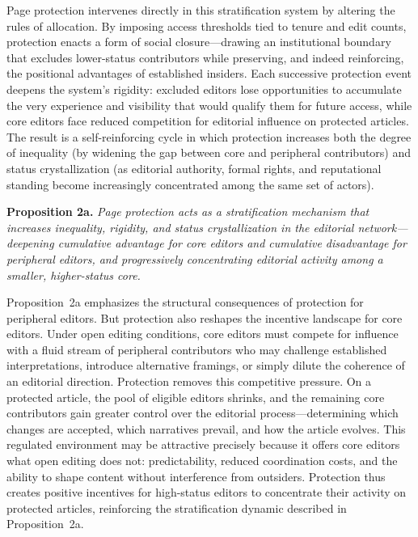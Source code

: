 \documentclass[11pt]{article}
\begin{document}
Page protection intervenes directly in this stratification system by altering the rules of allocation. By imposing access thresholds tied to tenure and edit counts, protection enacts a form of social closure---drawing an institutional boundary that excludes lower-status contributors while preserving, and indeed reinforcing, the positional advantages of established insiders. Each successive protection event deepens the system's rigidity: excluded editors lose opportunities to accumulate the very experience and visibility that would qualify them for future access, while core editors face reduced competition for editorial influence on protected articles. The result is a self-reinforcing cycle in which protection increases both the degree of inequality (by widening the gap between core and peripheral contributors) and status crystallization (as editorial authority, formal rights, and reputational standing become increasingly concentrated among the same set of actors).

\smallskip
\noindent\textbf{Proposition 2a.} \emph{Page protection acts as a stratification mechanism that increases inequality, rigidity, and status crystallization in the editorial network---deepening cumulative advantage for core editors and cumulative disadvantage for peripheral editors, and progressively concentrating editorial activity among a smaller, higher-status core.}

\smallskip
Proposition~2a emphasizes the structural consequences of protection for peripheral editors. But protection also reshapes the incentive landscape for core editors. Under open editing conditions, core editors must compete for influence with a fluid stream of peripheral contributors who may challenge established interpretations, introduce alternative framings, or simply dilute the coherence of an editorial direction. Protection removes this competitive pressure. On a protected article, the pool of eligible editors shrinks, and the remaining core contributors gain greater control over the editorial process---determining which changes are accepted, which narratives prevail, and how the article evolves. This regulated environment may be attractive precisely because it offers core editors what open editing does not: predictability, reduced coordination costs, and the ability to shape content without interference from outsiders. Protection thus creates positive incentives for high-status editors to concentrate their activity on protected articles, reinforcing the stratification dynamic described in Proposition~2a.
\end{document}
